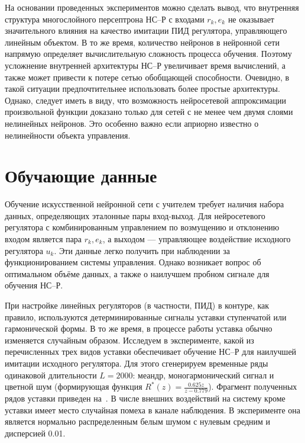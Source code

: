 На основании проведенных экспериментов можно сделать вывод, что
внутренняя структура многослойного персептрона НС--Р с входами
$r_k,e_k$ не оказывает значительного влияния на качество имитации ПИД
регулятора, управляющего линейным объектом.  В то же время, количество
нейронов в нейронной сети напрямую определяет вычислительную сложность
процесса обучения.  Поэтому усложнение внутренней архитектуры НС--Р
увеличивает время вычислений, а также может привести к потере сетью
обобщающей способности.  Очевидно, в такой ситуации предпочтительнее
использовать более простые архитектуры.  Однако, следует иметь в виду,
что возможность нейросетевой аппроксимации произвольной функции
доказано только для сетей с не менее чем двумя слоями нелинейных
нейронов.  Это особенно важно если априорно известно о нелинейности
объекта управления.

\section{Обучающие данные}

Обучение искусственной нейронной сети с учителем требует наличия
набора данных, определяющих эталонные пары вход-выход.  Для
нейросетевого регулятора с комбинированным управлением по возмущению и
отклонению входом является пара $r_k,e_k$, а выходом --- управляющее
воздействие исходного регулятора $u_k$.  Эти данные легко получить при
наблюдении за функционированием системы управления.  Однако возникает
вопрос об оптимальном объёме данных, а также о наилучшем пробном
сигнале для обучения НС--Р.


При настройке линейных регуляторов (в частности, ПИД) в контуре, как
правило, используются детерминированные сигналы уставки ступенчатой
или гармонической формы.  В то же время, в процессе работы уставка
обычно изменяется случайным образом.  Исследуем в эксперименте, какой
из перечисленных трех видов уставки обеспечивает обучение НС--Р для
наилучшей имитации исходного регулятора.  Для этого сгенерируем
временные ряды одинаковой длительности $L=2000$: меандр,
моногармонический сигнал и цветной шум (формирующая функция
$R^*(z)=\frac{0.625z}{z-0.779}$).  Фрагмент полученных рядов уставки
приведен на~.  В числе внешних воздействий
на систему кроме уставки имеет место случайная помеха в канале
наблюдения.  В эксперименте она является нормально распределенным
белым шумом с нулевым средним и дисперсией 0.01.

